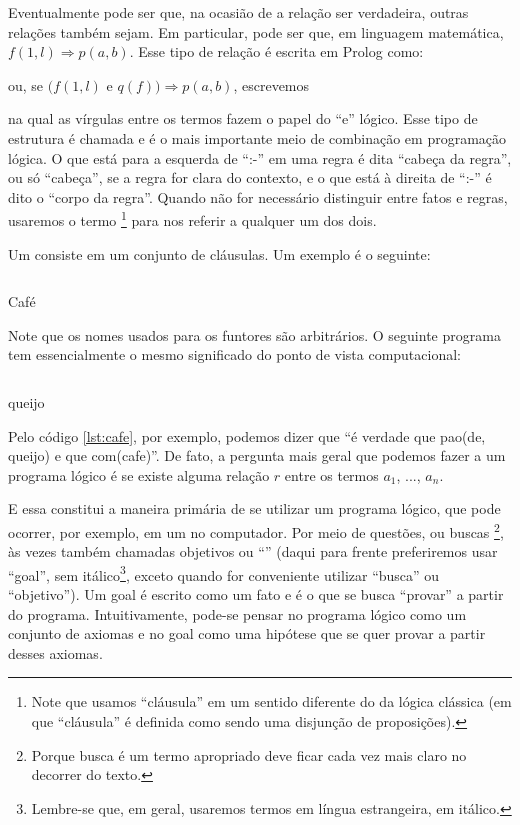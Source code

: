 \documentclass{article}
\begin{document}
Eventualmente pode ser que, na ocasião de a relação 
ser verdadeira, outras relações também sejam.  Em particular, pode ser
que, em linguagem matemática, $ f(1,l) \Rightarrow p(a,b) $. Esse tipo de
relação é escrita em Prolog como:


\noindent ou, se $ (f(1,l)$ e $q(f)) \Rightarrow p(a,b) $, escrevemos


\noindent na qual as vírgulas entre os termos fazem o papel do ``e''
lógico. Esse tipo de estrutura é chamada  e é o mais
importante meio de combinação em programação lógica. O que está para a
esquerda de ``:-'' em uma regra é dita ``cabeça da regra'', ou só
``cabeça'', se a regra for clara do contexto, e o que está à direita
de ``:-'' é dito o ``corpo da regra''. Quando não for necessário
distinguir entre fatos e regras, usaremos o termo
\footnote{Note que usamos ``cláusula'' em um
sentido diferente do da lógica clássica (em que ``cláusula'' é
definida como sendo uma disjunção de proposições). } para nos referir
a qualquer um dos dois.

Um  consiste em um conjunto de
cláusulas. Um exemplo é o seguinte:\\

\begin{listing}
  \inputminted{prolog}{../Exemplos/Cap0/prog1_cafe.pl}
  \caption{Café}\label{lst:cafe}
\end{listing}

Note que os nomes usados para os funtores são arbitrários. O seguinte
programa tem essencialmente o mesmo significado do ponto de vista
computacional:\\

%
\begin{listing}
  \inputminted{prolog}{../Exemplos/Cap0/prog2_queijo.pl}
  \caption{queijo}\label{lst:queijo}
\end{listing}

Pelo código \ref{lst:cafe}, por exemplo, podemos dizer que ``é verdade
que pao(de, queijo) e que com(cafe)''. De fato, a pergunta mais geral
que podemos fazer a um programa lógico é se existe alguma relação $r$
entre os termos $a_1$, ..., $a_n$.

E essa constitui a maneira primária de se utilizar um programa lógico,
que pode ocorrer, por exemplo, em um  no
computador. Por meio de questões, ou buscas \footnote{Porque busca é
um termo apropriado deve ficar cada vez mais claro no decorrer do
texto.}, às vezes também chamadas objetivos ou ``''
(daqui para frente preferiremos usar ``goal'', sem
itálico\footnote{Lembre-se que, em geral, usaremos termos em língua
  estrangeira, em itálico.}, exceto quando for conveniente utilizar
``busca'' ou ``objetivo''). Um goal é escrito como um fato e é o que
se busca ``provar'' a partir do programa. Intuitivamente, pode-se
pensar no programa lógico como um conjunto de axiomas e no goal como
uma hipótese que se quer provar a partir desses axiomas. 
\end{document}
